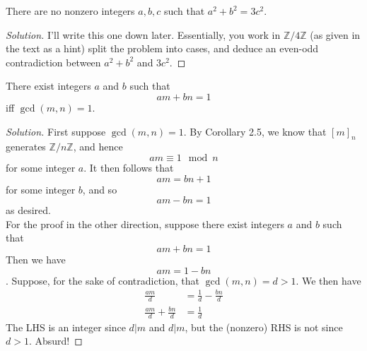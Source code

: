 \documentclass[12pt]{article}
\newenvironment{problem}[2][Problem]{\begin{trivlist}
\item[\hskip \labelsep {\bfseries #1}\hskip \labelsep {\bfseries #2.}]}{\end{trivlist}}
\newenvironment{solution}
  {\renewcommand\qedsymbol{$\blacksquare$}\begin{proof}[Solution]}
{\end{proof}}
\begin{document}
\begin{problem}{2.12}
  There are no nonzero integers $a,b,c$ such that $a^2+b^2=3c^2$.
\end{problem}
\begin{solution}
  I'll write this one down later. 
  Essentially, you work in $\mathbb{Z}/4\mathbb{Z}$ (as given in the text as a hint) split the problem into cases, and deduce an even-odd contradiction between $a^2+b^2$ and $3c^2$.
\end{solution}
\begin{problem}{2.13}
  There exist integers $a$ and $b$ such that $$am+bn=1$$ iff $\gcd(m,n)=1$.
\end{problem}
\begin{solution}
  First suppose $\gcd(m,n)=1$. 
  By Corollary 2.5, we know that $[m]_n$ generates $\mathbb{Z}/n\mathbb{Z}$, and hence 
  $$am\equiv 1\mod n$$ for some integer $a$.
  It then follows that $$am = bn + 1$$ for some integer $b$, and so $$am-bn=1$$ as desired.\\
  For the proof in the other direction, suppose there exist integers $a$ and $b$ such that 
  $$am+bn=1$$
  Then we have $$am = 1-bn$$. 
  Suppose, for the sake of contradiction, that $\gcd(m,n)=d>1$. We then have
  \begin{align*}
    \frac{am}{d} &= \frac{1}{d} - \frac{bn}{d} \\
    \frac{am}{d} + \frac{bn}{d} &= \frac{1}{d}
  \end{align*}
  The LHS is an integer since $d|m$ and $d|m$, but the (nonzero) RHS is not since $d>1$. Absurd!
\end{solution}
\end{document}
